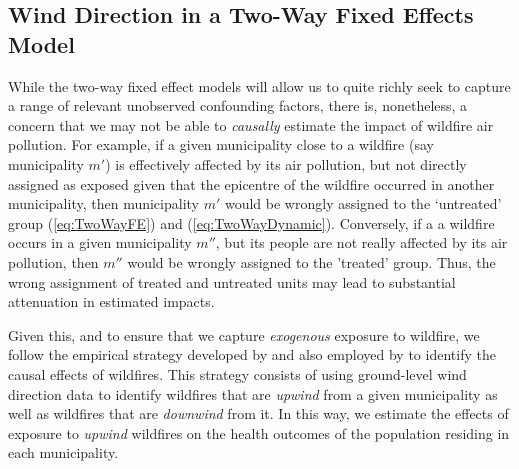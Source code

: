 \documentclass[11pt]{article}
\begin{document}
\begin{spacing}{1.3}



\subsection{Wind Direction in a Two-Way Fixed Effects Model}
\label{sscn:wind}
While the two-way fixed effect models will allow us to quite richly seek to capture a range of relevant unobserved confounding factors, there is, nonetheless, a concern that we may not be able to \emph{causally} estimate the impact of wildfire air pollution. For example, if a given municipality close to a wildfire (say municipality $m'$) is effectively affected by its air pollution, but not directly assigned as exposed given that the epicentre of the wildfire occurred in another municipality, then municipality $m'$ would be wrongly assigned to the `untreated' group (\ref{eq:TwoWayFE}) and (\ref{eq:TwoWayDynamic}). Conversely, if a a wildfire occurs in a given municipality $m''$, but its people are not really affected by its air pollution, then $m''$ would be wrongly assigned to the 'treated' group. Thus, the wrong assignment of treated and untreated units may lead to substantial attenuation in estimated impacts.  


Given this, and to ensure that we capture \emph{exogenous} exposure to wildfire, we follow the empirical strategy developed by \cite{RangelVogl2019} and also employed by \cite{zivin2020unintended} to identify the causal effects of wildfires. %
This strategy consists of using ground-level wind direction data to identify wildfires that are \textit{upwind} from a given municipality as well as wildfires that are \textit{downwind} from it. In this way, we estimate the effects of exposure to \textit{upwind} wildfires on the health outcomes of the population residing in each municipality. 


\end{spacing}
\end{document}
